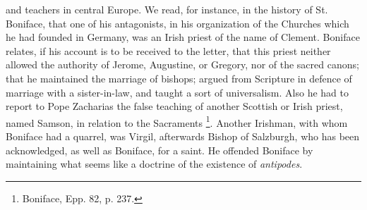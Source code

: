 and teachers in central Europe. We read, for instance, in the history
of St. Boniface, that one of his antagonists, in his organization of
the Churches which he had founded in Germany, was an Irish priest of
the name of Clement. Boniface relates, if his account is to be
received to the letter, that this priest neither allowed the authority
of Jerome, Augustine, or Gregory, nor of the sacred canons; that he
maintained the marriage of bishops; argued from Scripture in defence
of marriage with a sister-in-law, and taught a sort of universalism.
Also he had to report to Pope Zacharias the false teaching of another
Scottish or Irish priest, named Samson, in relation to the Sacraments
\footnote{Boniface, Epp.
82, p. 237.}. Another Irishman,
with whom Boniface had a quarrel, was Virgil, afterwards Bishop
of Salzburgh, who has been acknowledged, as well as Boniface, for a
saint. He offended Boniface by maintaining what seems like a doctrine
of the existence of \emph{antipodes}.

